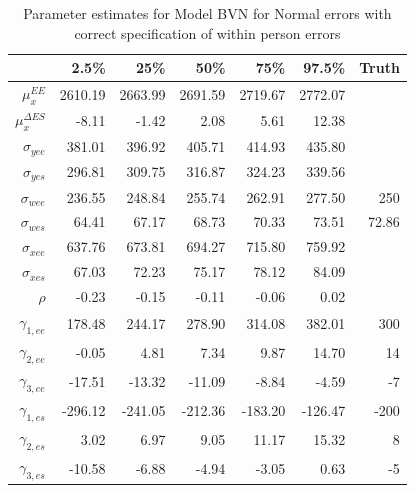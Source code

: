 \documentclass[11pt]{article}\usepackage[]{graphicx}\usepackage[]{color}
\begin{document}
\begin{table}[ht]
\centering
\begin{tabular}{rrrrrr|r}
  \hline
 & 2.5\% & 25\% & 50\% & 75\% & 97.5\% & Truth\\
  \hline
$\mu_x^{EE}$ & 2610.19 & 2663.99 & 2691.59 & 2719.67 & 2772.07 \\ 
  $\mu_x^{\Delta ES}$ & -8.11 & -1.42 & 2.08 & 5.61 & 12.38 \\ 
  $\sigma_{yee}$ & 381.01 & 396.92 & 405.71 & 414.93 & 435.80 \\ 
  $\sigma_{yes}$ & 296.81 & 309.75 & 316.87 & 324.23 & 339.56 \\ 
  $\sigma_{wee}$ & 236.55 & 248.84 & 255.74 & 262.91 & 277.50 & 250\\ 
  $\sigma_{wes}$ & 64.41 & 67.17 & 68.73 & 70.33 & 73.51 & 72.86\\ 
  $\sigma_{xee}$ & 637.76 & 673.81 & 694.27 & 715.80 & 759.92 \\ 
  $\sigma_{xes}$ & 67.03 & 72.23 & 75.17 & 78.12 & 84.09 \\ 
  $\rho$ & -0.23 & -0.15 & -0.11 & -0.06 & 0.02 \\ 
  $\gamma_{1,ee}$ & 178.48 & 244.17 & 278.90 & 314.08 & 382.01 & 300\\ 
  $\gamma_{2,ee}$ & -0.05 & 4.81 & 7.34 & 9.87 & 14.70 & 14\\ 
  $\gamma_{3,ee}$ & -17.51 & -13.32 & -11.09 & -8.84 & -4.59 & -7\\ 
  $\gamma_{1,es}$ & -296.12 & -241.05 & -212.36 & -183.20 & -126.47 & -200 \\ 
  $\gamma_{2,es}$ & 3.02 & 6.97 & 9.05 & 11.17 & 15.32 & 8\\ 
  $\gamma_{3,es}$ & -10.58 & -6.88 & -4.94 & -3.05 & 0.63 & -5\\ 
  \hline
\end{tabular}
\caption{Parameter estimates for Model BVN for Normal errors with correct specification of within person errors}
\label{mbvnwpestimates}
\end{table}
\end{document}

